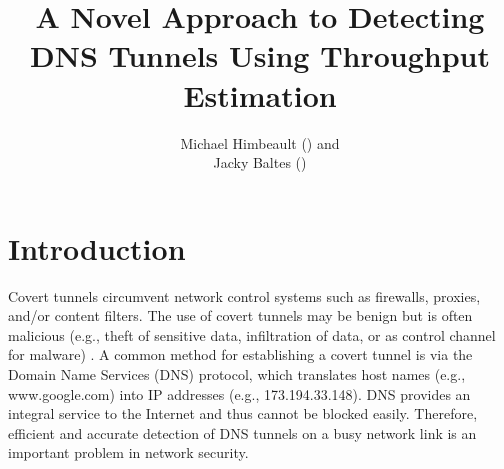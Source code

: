\documentclass{llncs}
\begin{document}
%
\title{A Novel Approach to Detecting DNS Tunnels Using Throughput Estimation}
\author{Michael Himbeault () and \\
Jacky Baltes ()}
\maketitle


\smallskip
{}

\section{Introduction}

Covert tunnels circumvent network control systems such as firewalls,
proxies, and/or content filters. The use of covert tunnels may be
benign \cite{sans-dnshash} but is often malicious (e.g., theft of
sensitive data, infiltration of data, or as control channel for
malware) \cite{Dietrich2011}. A common method for establishing a
covert tunnel is via the Domain Name Services (DNS) protocol, which
translates host names (e.g., www.google.com) into IP addresses (e.g.,
173.194.33.148). DNS provides an integral service to the Internet and
thus cannot be blocked easily. Therefore, efficient and accurate
detection of DNS tunnels on a busy network link is an important
problem in network security.


\end{document}
